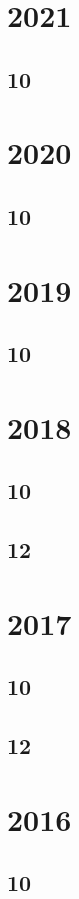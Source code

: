 \documentclass[11pt]{book}
\begin{document}
\section{2021}
\subsection{10}

\section{2020}
\subsection{10}

\section{2019}
\subsection{10}

\section{2018}
\subsection{10}


\subsection{12}



\section{2017}
\subsection{10}

\subsection{12}


\section{2016}
\subsection{10}

\end{document}
